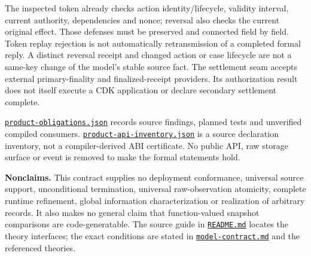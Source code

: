 \documentclass[10pt,a4paper]{article}
\newcommand{\source}[1]{\href{../#1}{\nolinkurl{#1}}}
\begin{document}
The inspected token already checks action identity/lifecycle, validity
interval, current authority, dependencies and nonce; reversal also checks the
current original effect. Those defenses must be preserved and connected
field by field. Token replay rejection is not automatically retransmission of
a completed formal reply. A distinct reversal receipt and changed action or
case lifecycle are not a same-key change of the model's stable source fact.
The settlement seam accepts external primary-finality and finalized-receipt
providers. Its authorization result does not itself execute a CDK application
or declare secondary settlement complete.

\source{product-obligations.json} records source findings, planned tests and
unverified compiled consumers. \source{product-api-inventory.json} is a source
declaration inventory, not a compiler-derived ABI certificate. No public API,
raw storage surface or event is removed to make the formal statements hold.

\textbf{Nonclaims.} This contract supplies no deployment conformance,
universal source support, unconditional termination, universal raw-observation
atomicity, complete runtime refinement, global information characterization
or realization of arbitrary records. It also makes no general claim that
function-valued snapshot comparisons are code-generatable. The source guide
in \source{README.md} locates the theory interfaces; the exact conditions are
stated in \source{model-contract.md} and the referenced theories.

\begingroup
\small
\setlength{\parskip}{2pt}


\endgroup
\end{document}
